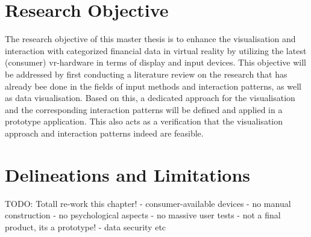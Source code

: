 \section{Research Objective}

The research objective of this master thesis is to enhance the visualisation and interaction with categorized financial data in virtual reality by utilizing the latest (consumer) \gls{vr}-hardware in terms of display and input devices. \newline
This objective will be addressed by first conducting a literature review on the research that has already bee done in the fields of input methods and interaction patterns, as well as data visualisation. Based on this, a dedicated approach for the visualisation and the corresponding interaction patterns will be defined and applied in a prototype application. This also acts as a verification that the visualisation approach and interaction patterns indeed are feasible.






\section{Delineations and Limitations}

TODO: Totall re-work this chapter! \newline
- consumer-available devices \newline
- no manual construction \newline
- no psychological aspects \newline
- no massive user tests \newline
- not a final product, its a prototype! \newline
- data security etc \newline


